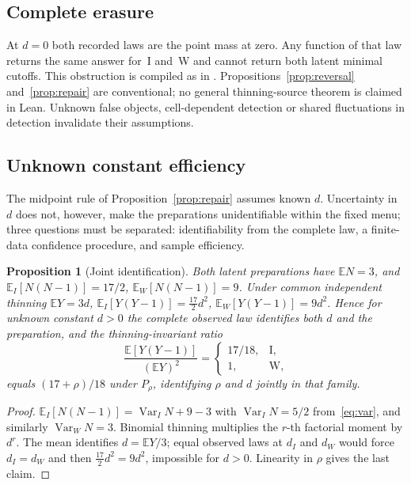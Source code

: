 \documentclass[11pt,a4paper]{article}
\theoremstyle{plain}
\newtheorem{proposition}[theorem]{Proposition}
\theoremstyle{definition}
\theoremstyle{remark}
\newcommand{\EE}{\mathbb E}
\newcommand{\Var}{\operatorname{Var}}
\begin{document}
\subsection{Complete erasure}
At $d=0$ both recorded laws are the point mass at zero. Any function of that law returns the same answer for~I and~W and cannot return both latent minimal cutoffs. This obstruction is compiled as  in . Propositions~\ref{prop:reversal} and~\ref{prop:repair} are conventional; no general thinning-source theorem is claimed in Lean. Unknown false objects, cell-dependent detection or shared fluctuations in detection invalidate their assumptions.

\subsection{Unknown constant efficiency}\label{sec:unknownd}
The midpoint rule of Proposition~\ref{prop:repair} assumes known $d$. Uncertainty in $d$ does not, however, make the preparations unidentifiable within the fixed menu; three questions must be separated: identifiability from the complete law, a finite-data confidence procedure, and sample efficiency.

\begin{proposition}[Joint identification]\label{prop:ident}
Both latent preparations have $\EE N=3$, and $\EE_I[N(N-1)]=17/2$, $\EE_W[N(N-1)]=9$. Under common independent thinning $\EE Y=3d$, $\EE_I[Y(Y-1)]=\tfrac{17}2d^2$, $\EE_W[Y(Y-1)]=9d^2$. Hence for unknown constant $d>0$ the complete observed law identifies both $d$ and the preparation, and the thinning-invariant ratio
\begin{equation}\label{eq:ratio}
\frac{\EE[Y(Y-1)]}{(\EE Y)^2}=\begin{cases}17/18,&\text{I},\\1,&\text{W},\end{cases}
\end{equation}
equals $(17+\rho)/18$ under $P_\rho$, identifying $\rho$ and $d$ jointly in that family.
\end{proposition}
\begin{proof}
$\EE_I[N(N-1)]=\Var_I N+9-3$ with $\Var_IN=5/2$ from~\eqref{eq:var}, and similarly $\Var_WN=3$. Binomial thinning multiplies the $r$-th factorial moment by $d^r$. The mean identifies $d=\EE Y/3$; equal observed laws at $d_I$ and $d_W$ would force $d_I=d_W$ and then $\tfrac{17}2d^2=9d^2$, impossible for $d>0$. Linearity in $\rho$ gives the last claim.
\end{proof}
\end{document}
